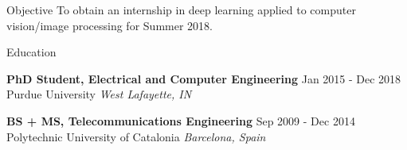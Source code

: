 \documentclass{resume} %
\begin{document}
\vspace{-5pt}
\begin{rSection}{Objective}
To obtain an internship in deep learning applied to computer vision/image processing for Summer 2018.

\end{rSection}

\begin{rSection}{Education}

{\bf PhD Student, Electrical and Computer Engineering} \hfill {Jan 2015 - Dec 2018} \\
Purdue University \hfill {\em West Lafayette, IN\\}


{\bf BS + MS, Telecommunications Engineering} \hfill {Sep 2009 - Dec 2014} \\ 
Polytechnic University of Catalonia \hfill {\em Barcelona, Spain}

\vspace{5pt}

\end{rSection}

\end{document}
